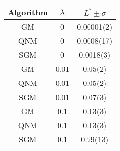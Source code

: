 \begin{tabular}{cS[table-format=1.2]S[table-format=1.5(2)]}
	\toprule
    Algorithm & $\lambda$ & {$L^* \pm \sigma$}  \\ \midrule
	GM        & 0         & 0.00001(2)                   \\
	QNM       & 0         & 0.0008(17)                 \\
	SGM       & 0         & 0.0018(3)                  \\
	\addlinespace
	GM        & 0.01      & 0.05(2)                   \\
	QNM       & 0.01      & 0.05(2)                   \\
	SGM       & 0.01      & 0.07(3)                   \\
	\addlinespace
	GM        & 0.1       & 0.13(3)   \\
	QNM       & 0.1       & 0.13(3)   \\
	SGM       & 0.1       & 0.29(13)                   \\ \bottomrule
\end{tabular}
